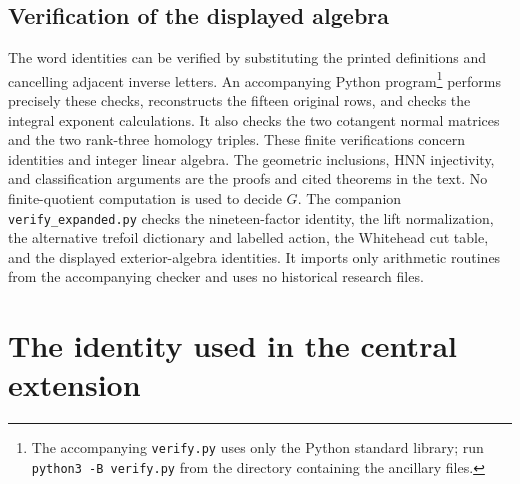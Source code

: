 \documentclass[11pt]{amsart}
\theoremstyle{definition}
\theoremstyle{remark}
\begin{document}
\subsection*{Verification of the displayed algebra}
The word identities can be verified by substituting the printed
definitions and cancelling adjacent inverse letters. An accompanying
Python program\footnote{The accompanying \texttt{verify.py} uses only
the Python standard library; run \texttt{python3 -B verify.py} from
the directory containing the ancillary files.} performs precisely these checks, reconstructs the
fifteen original rows, and checks the integral exponent calculations.
It also checks the two cotangent normal matrices and the two
rank-three homology triples. These finite verifications concern
identities and integer linear algebra. The geometric inclusions,
HNN injectivity, and classification arguments are the proofs and
cited theorems in the text. No finite-quotient computation is used
to decide $G$. The companion \texttt{verify\_expanded.py}
checks the nineteen-factor identity, the lift normalization, the
alternative trefoil dictionary and labelled action, the Whitehead cut
table, and the displayed exterior-algebra identities. It imports only
arithmetic routines from the accompanying checker and uses no historical
research files.

\section{The identity used in the central extension}\label{app:central-identity}
\end{document}
